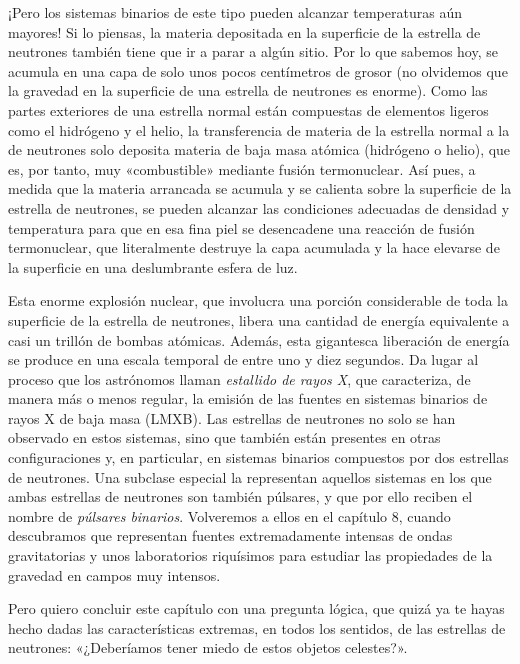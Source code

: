 ¡Pero los sistemas binarios de este tipo pueden alcanzar temperaturas aún mayores! Si lo piensas, la materia depositada en la superficie de la estrella de neutrones también tiene que ir a parar a algún sitio. Por lo que sabemos hoy, se acumula en una capa de solo unos pocos centímetros de grosor (no olvidemos que la gravedad en la superficie de una estrella de neutrones es enorme). Como las partes exteriores de una estrella normal están compuestas de elementos ligeros como el hidrógeno y el helio, la transferencia de materia de la estrella normal a la de neutrones solo deposita materia de baja masa atómica (hidrógeno o helio), que es, por tanto, muy «combustible» mediante fusión termonuclear. Así pues, a medida que la materia arrancada se acumula y se calienta sobre la superficie de la estrella de neutrones, se pueden alcanzar las condiciones adecuadas de densidad y temperatura para que en esa fina piel se desencadene una reacción de fusión termonuclear, que literalmente destruye la capa acumulada y la hace elevarse de la superficie en una deslumbrante esfera de luz.

Esta enorme explosión nuclear, que involucra una porción considerable de toda la superficie de la estrella de neutrones, libera una cantidad de energía equivalente a casi un trillón de bombas atómicas. Además, esta gigantesca liberación de energía se produce en una escala temporal de entre uno y diez segundos. Da lugar al proceso que los astrónomos llaman \emph{estallido de rayos X}, que caracteriza, de manera más o menos regular, la emisión de las fuentes en sistemas binarios de rayos X de baja masa (LMXB). Las estrellas de neutrones no solo se han observado en estos sistemas, sino que también están presentes en otras configuraciones y, en particular, en sistemas binarios compuestos por dos estrellas de neutrones. Una subclase especial la representan aquellos sistemas en los que ambas estrellas de neutrones son también púlsares, y que por ello reciben el nombre de \emph{púlsares binarios}. Volveremos a ellos en el capítulo 8, cuando descubramos que representan fuentes extremadamente intensas de ondas gravitatorias y unos laboratorios riquísimos para estudiar las propiedades de la gravedad en campos muy intensos.

Pero quiero concluir este capítulo con una pregunta lógica, que quizá ya te hayas hecho dadas las características extremas, en todos los sentidos, de las estrellas de neutrones: «¿Deberíamos tener miedo de estos objetos celestes?».

